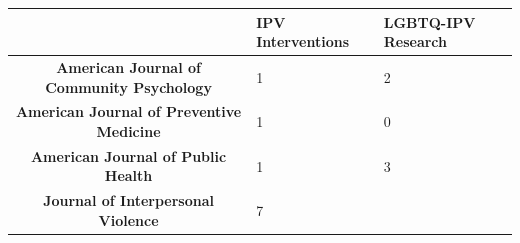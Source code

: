 \documentclass[]{tufte-handout}
\begin{document}
\begin{longtable}[]{@{}cll@{}}
\toprule
\begin{minipage}[b]{0.49\columnwidth}\centering\strut
~\strut
\end{minipage} & \begin{minipage}[b]{0.21\columnwidth}\raggedright\strut
IPV Interventions\strut
\end{minipage} & \begin{minipage}[b]{0.21\columnwidth}\raggedright\strut
LGBTQ-IPV Research\strut
\end{minipage}\tabularnewline
\midrule
\endhead
\begin{minipage}[t]{0.49\columnwidth}\centering\strut
\textbf{American Journal of Community Psychology}\strut
\end{minipage} & \begin{minipage}[t]{0.21\columnwidth}\raggedright\strut
1\strut
\end{minipage} & \begin{minipage}[t]{0.21\columnwidth}\raggedright\strut
2\strut
\end{minipage}\tabularnewline
\begin{minipage}[t]{0.49\columnwidth}\centering\strut
\textbf{American Journal of Preventive Medicine}\strut
\end{minipage} & \begin{minipage}[t]{0.21\columnwidth}\raggedright\strut
1\strut
\end{minipage} & \begin{minipage}[t]{0.21\columnwidth}\raggedright\strut
0\strut
\end{minipage}\tabularnewline
\begin{minipage}[t]{0.49\columnwidth}\centering\strut
\textbf{American Journal of Public Health}\strut
\end{minipage} & \begin{minipage}[t]{0.21\columnwidth}\raggedright\strut
1\strut
\end{minipage} & \begin{minipage}[t]{0.21\columnwidth}\raggedright\strut
3\strut
\end{minipage}\tabularnewline
\begin{minipage}[t]{0.49\columnwidth}\centering\strut
\textbf{Journal of Interpersonal Violence}\strut
\end{minipage} & \begin{minipage}[t]{0.21\columnwidth}\raggedright\strut
7\strut
\end{minipage} & \begin{minipage}[t]{0.21\columnwidth}\raggedright\strut

\end{minipage}
\end{longtable}
\end{document}
